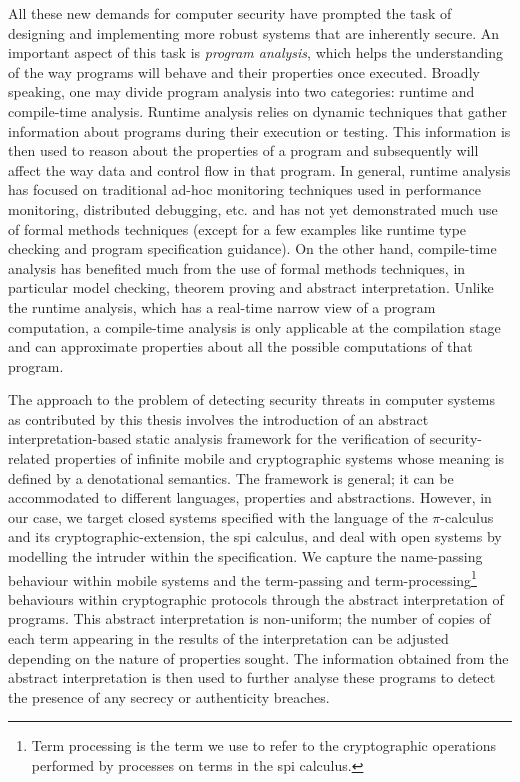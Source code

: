 \documentclass[10pt,a4paper,final,oneside,fleqn]{book}
\begin{document}
All these new demands for computer security have prompted the task of designing and implementing more robust systems that are inherently secure.  An important aspect of this task is {\itshape program analysis\/}, which helps the understanding of the way programs will behave and their properties once executed.  Broadly speaking, one may divide program analysis into two categories: runtime and compile-time analysis.  Runtime analysis relies on dynamic techniques that gather information about programs during their execution or testing.  This information is then used to reason about the properties of a program and subsequently will affect the way data and control flow in that program.  In general, runtime analysis has focused on traditional ad-hoc monitoring techniques used in performance monitoring, distributed debugging, etc. and has not yet demonstrated much use of formal methods techniques (except for a few examples like runtime type checking and program specification guidance).  On the other hand, compile-time analysis has benefited much from the use of formal methods techniques, in particular model checking, theorem proving and abstract interpretation.  Unlike the runtime analysis, which has a real-time narrow view of a program computation, a compile-time analysis is only applicable at the compilation stage and can approximate properties about all the possible computations of that program.
 
The approach to the problem of detecting security threats in computer systems as contributed by this thesis involves the introduction of an abstract interpretation-based static analysis framework for the verification of security-related properties of infinite mobile and cryptographic systems whose meaning is defined by a denotational semantics.  The framework is general; it can be accommodated to different languages, properties and abstractions.  However, in our case, we target closed systems specified with the language of the $\pi$-calculus and its cryptographic-extension, the spi calculus, and deal with open systems by modelling the intruder within the specification.  We capture the name-passing behaviour within mobile systems and the term-passing and term-processing\footnote{Term processing is the term we use to refer to the cryptographic operations performed by processes on terms in the spi calculus.} behaviours within cryptographic protocols through the abstract interpretation of programs.  This abstract interpretation is non-uniform; the number of copies of each term appearing in the results of the interpretation can be adjusted depending on the nature of properties sought.  The information obtained from the abstract interpretation is then used to further analyse these programs to detect the presence of any secrecy or authenticity breaches.
\end{document}
